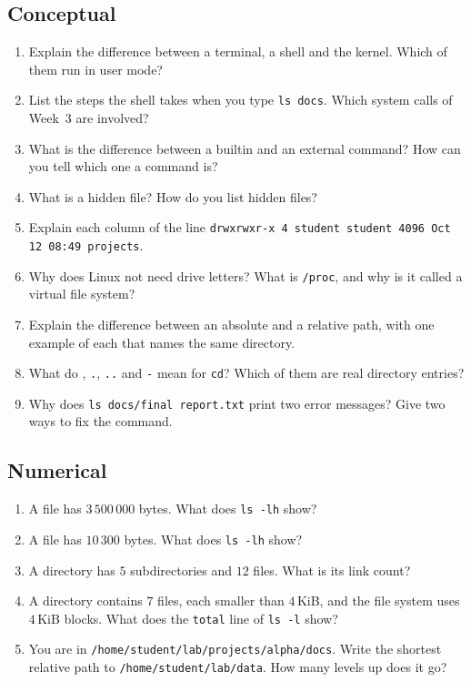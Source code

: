 \documentclass[11pt,a4paper]{article}
\newcommand{\cmd}[1]{\texttt{#1}}
\begin{document}
\subsection*{Conceptual}
\begin{enumerate}[leftmargin=1.6em]
  \item Explain the difference between a terminal, a shell and the kernel. Which of them run in user mode?
  \item List the steps the shell takes when you type \cmd{ls docs}. Which system calls of Week~3 are involved?
  \item What is the difference between a builtin and an external command? How can you tell which one a command is?
  \item What is a hidden file? How do you list hidden files?
  \item Explain each column of the line \texttt{drwxrwxr-x 4 student student 4096 Oct 12 08:49 projects}.
  \item Why does Linux not need drive letters? What is \texttt{/proc}, and why is it called a virtual file system?
  \item Explain the difference between an absolute and a relative path, with one example of each that names the same directory.
  \item What do \texttt{\tl}, \texttt{.}, \texttt{..} and \texttt{-} mean for \cmd{cd}? Which of them are real directory entries?
  \item Why does \cmd{ls docs/final report.txt} print two error messages? Give two ways to fix the command.
\end{enumerate}

\subsection*{Numerical}
\begin{enumerate}[leftmargin=1.6em,resume]
  \item A file has $3\,500\,000$ bytes. What does \cmd{ls -lh} show?
  \item A file has $10\,300$ bytes. What does \cmd{ls -lh} show?
  \item A directory has $5$ subdirectories and $12$ files. What is its link count?
  \item A directory contains $7$ files, each smaller than $4$\,KiB, and the file system uses $4$\,KiB blocks. What does the \texttt{total} line of \cmd{ls -l} show?
  \item You are in \texttt{/home/student/lab/projects/alpha/docs}. Write the shortest relative path to \texttt{/home/student/lab/data}. How many levels up does it go?
\end{enumerate}
\end{document}
